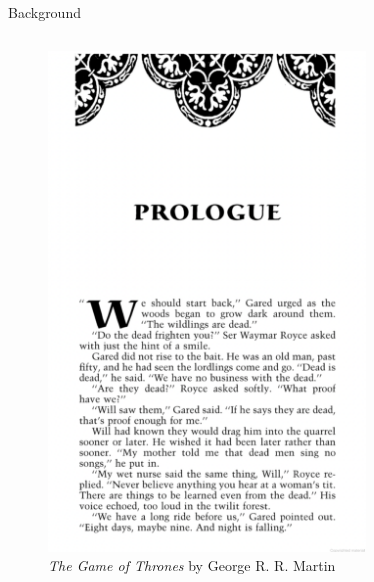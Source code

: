 \documentclass[mathserif, 13pt, aspectratio=1610]{beamer}
\begin{document}
\begin{frame}{Background}
\begin{columns}[T]
		\centering
		\begin{figure}[h!]
			\centering
			\includegraphics[width=0.75\textwidth]{the-game-of-thrones.png}
			\caption{\textit{The Game of Thrones} by George R. R. Martin}
			\label{fig:the-game-of-thrones}
		\end{figure}
	\end{columns}
\end{frame}
\end{document}

